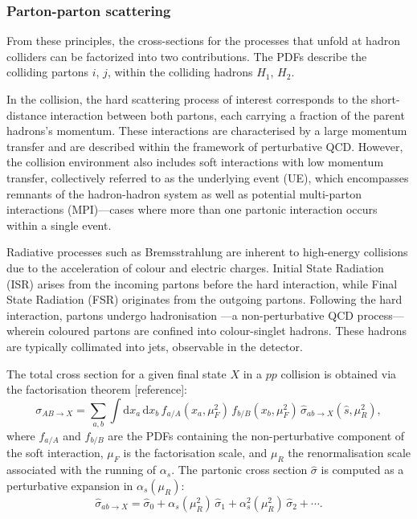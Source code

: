 \documentclass[11pt,twoside]{book}
\begin{document}
\subsubsection*{Parton-parton scattering}
\label{subsubsec:proton}
From these principles, the cross-sections for the processes that unfold at hadron colliders can be factorized into two contributions. The \acrshort{PDF}s describe the colliding partons $i$, $j$, within the colliding hadrons $H_{1}$, $H_{2}$. 

In the collision, the hard scattering process of interest corresponds to the short-distance interaction between both partons, each carrying a fraction of the parent hadrons's momentum. These interactions are characterised by a large momentum transfer and are described within the framework of perturbative \acrshort{QCD}. However, the collision environment also includes soft interactions with low momentum transfer, collectively referred to as the underlying event (UE), which encompasses remnants of the hadron-hadron system as well as potential multi-parton interactions (MPI)—cases where more than one partonic interaction occurs within a single event.

Radiative processes such as Bremsstrahlung are inherent to high-energy collisions due to the acceleration of colour and electric charges. Initial State Radiation (ISR) arises from the incoming partons before the hard interaction, while Final State Radiation (FSR) originates from the outgoing partons. Following the hard interaction, partons undergo hadronisation —a non-perturbative \acrshort{QCD} process—wherein coloured partons are confined into colour-singlet hadrons. These hadrons are typically collimated into jets, observable in the detector.

The total cross section for a given final state $X$ in a $pp$ collision is obtained via the factorisation theorem [reference]:
\begin{equation}
\sigma_{AB \to X} = \sum_{a,b} \int \mathrm{d}x_a \, \mathrm{d}x_b \, f_{a/A}(x_a, \mu_F^2) \, f_{b/B}(x_b, \mu_F^2) \, \hat{\sigma}_{ab \to X}(\hat{s}, \mu_R^2),
\end{equation}
where $f_{a/A}$ and $f_{b/B}$ are the \acrshort{PDF}s containing the non-perturbative component of the soft interaction, $\mu_F$ is the factorisation scale, and $\mu_R$ the renormalisation scale associated with the running of $\alpha_s$. The partonic cross section $\hat{\sigma}$ is computed as a perturbative expansion in $\alpha_s(\mu_R)$:
\begin{equation}
\hat{\sigma}_{ab \to X} = \hat{\sigma}_0 + \alpha_s(\mu_R^2)\, \hat{\sigma}_1 + \alpha_s^2(\mu_R^2)\, \hat{\sigma}_2 + \cdots.
\end{equation}
\end{document}
